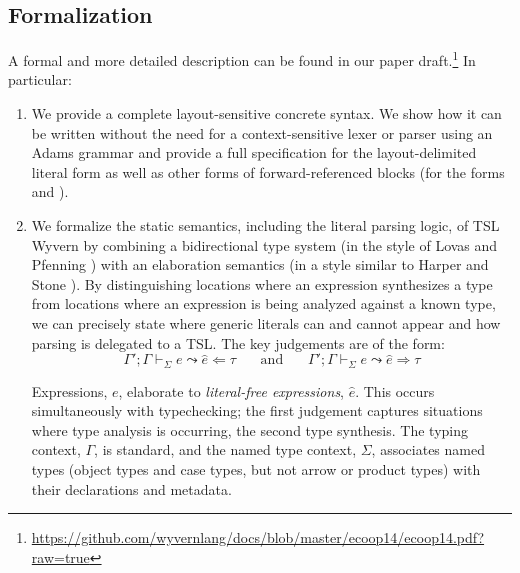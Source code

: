 {\subsection{Formalization}
A formal and more detailed description can be found in our paper draft.\footnote{\url{https://github.com/wyvernlang/docs/blob/master/ecoop14/ecoop14.pdf?raw=true}} In particular:
\begin{enumerate}
\item We provide a complete layout-sensitive concrete syntax. We show how it can be written without the need for a context-sensitive lexer or parser using an Adams grammar and provide a full specification for the layout-delimited literal form as well as other forms of forward-referenced blocks (for the forms  and ).
\item We formalize the static semantics, including the literal parsing logic, of TSL Wyvern by combining a bidirectional type system (in the style of Lovas and Pfenning \cite{Lovas08abidirectional}) with an elaboration semantics (in a style similar to Harper and Stone \cite{Harper00atype-theoretic}). By distinguishing locations where an expression synthesizes a type from locations where an expression is being analyzed against a known type, we can precisely state where generic literals can and cannot appear and how parsing is delegated to a TSL. The key judgements are of the form:
\[\Gamma'; \Gamma \vdash_\Sigma e \leadsto \hat{e} \Leftarrow \tau~~~~~~~~\text{and}~~~~~~~~\Gamma'; \Gamma \vdash_\Sigma e  \leadsto \hat{e} \Rightarrow \tau\]

Expressions, $e$, elaborate to \emph{literal-free expressions}, $\hat{e}$. This occurs simultaneously with typechecking; the first judgement captures situations where type analysis is occurring, the second type synthesis. The typing context, $\Gamma$, is standard, and the named type context, $\Sigma$, associates named types (object types and case types, but not arrow or product types) with their declarations and metadata. 


\end{enumerate}}
